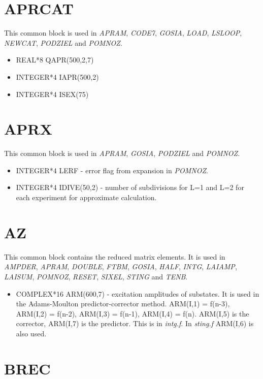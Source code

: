 \section{APRCAT}

This common block is used in {\em APRAM}, {\em CODE7}, {\em GOSIA}, {\em
LOAD}, {\em LSLOOP}, {\em NEWCAT}, {\em PODZIEL} and {\em POMNOZ}.

\begin{itemize}
\item REAL*8 QAPR(500,2,7)
\item INTEGER*4 IAPR(500,2)
\item INTEGER*4 ISEX(75)
\end{itemize}

\section{APRX}

This common block is used in {\em APRAM}, {\em GOSIA}, {\em PODZIEL} and
{\em POMNOZ}.

\begin{itemize}
\item INTEGER*4 LERF - error flag from expansion in {\em POMNOZ}.
\item INTEGER*4 IDIVE(50,2) - number of subdivisions for L=1 and L=2 for
each experiment for approximate calculation.
\end{itemize}

\section{AZ}

This common block contains the reduced matrix elements. It is used in {\em
AMPDER}, {\em APRAM}, {\em DOUBLE}, {\em FTBM}, {\em GOSIA}, {\em HALF},
{\em INTG}, {\em LAIAMP}, {\em LAISUM}, {\em POMNOZ}, {\em RESET}, {\em
SIXEL}, {\em STING} and {\em TENB}.

\begin{itemize}
\item COMPLEX*16 ARM(600,7) - excitation amplitudes of substates. It is used
in the Adams-Moulton predictor-corrector method. ARM(I,1) = f(n-3), ARM(I,2)
= f(n-2), ARM(I,3) = f(n-1), ARM(I,4) = f(n). ARM(I,5) is the corrector,
ARM(I,7) is the predictor. This is in {\em intg.f}. In {\em sting.f}
ARM(I,6) is also used.
\end{itemize}

\section{BREC}

